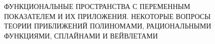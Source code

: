  \begin{center}
 {\large
ФУНКЦИОНАЛЬНЫЕ ПРОСТРАНСТВА С ПЕРЕМЕННЫМ \\[4pt]
ПОКАЗАТЕЛЕМ И ИХ ПРИЛОЖЕНИЯ. НЕКОТОРЫЕ ВОПРОСЫ \\[4pt]
ТЕОРИИ ПРИБЛИЖЕНИЙ ПОЛИНОМАМИ, РАЦИОНАЛЬНЫМИ\\[4pt]
ФУНКЦИЯМИ, СПЛАЙНАМИ И ВЕЙВЛЕТАМИ
}
 \\[12pt]
\end{center}
